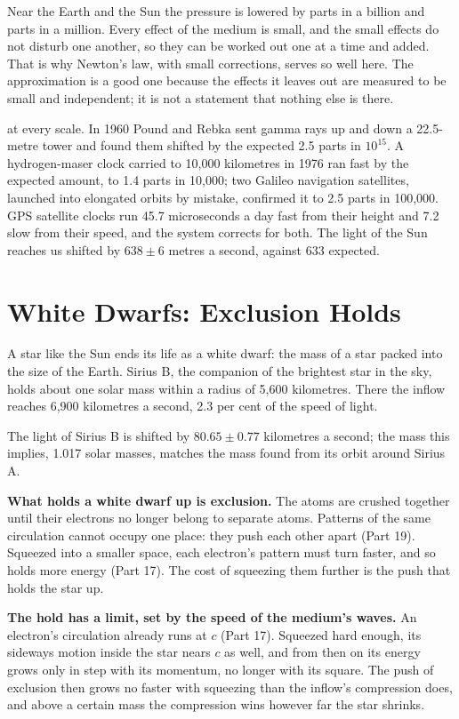 \documentclass[11pt,a4paper]{article}
\begin{document}
Near the Earth and the Sun the pressure is lowered by parts in a billion and parts in a million. Every effect of the medium is small, and the small effects do not disturb one another, so they can be worked out one at a time and added. That is why Newton's law, with small corrections, serves so well here. The approximation is a good one because the effects it leaves out are measured to be small and independent; it is not a statement that nothing else is there.

 at every scale. In 1960 Pound and Rebka sent gamma rays up and down a 22.5-metre tower and found them shifted by the expected 2.5 parts in $10^{15}$. A hydrogen-maser clock carried to 10,000 kilometres in 1976 ran fast by the expected amount, to 1.4 parts in 10,000; two Galileo navigation satellites, launched into elongated orbits by mistake, confirmed it to 2.5 parts in 100,000. GPS satellite clocks run 45.7 microseconds a day fast from their height and 7.2 slow from their speed, and the system corrects for both. The light of the Sun reaches us shifted by $638\pm6$ metres a second, against 633 expected.

\section{White Dwarfs: Exclusion Holds}

A star like the Sun ends its life as a white dwarf: the mass of a star packed into the size of the Earth. Sirius B, the companion of the brightest star in the sky, holds about one solar mass within a radius of 5,600 kilometres. There the inflow reaches 6,900 kilometres a second, 2.3 per cent of the speed of light.

 The light of Sirius B is shifted by $80.65\pm0.77$ kilometres a second; the mass this implies, 1.017 solar masses, matches the mass found from its orbit around Sirius A.

\begin{hypbar}
\textbf{What holds a white dwarf up is exclusion.} The atoms are crushed together until their electrons no longer belong to separate atoms. Patterns of the same circulation cannot occupy one place: they push each other apart (Part 19).\footnotemark{} Squeezed into a smaller space, each electron's pattern must turn faster, and so holds more energy (Part 17).\footnotemark{} The cost of squeezing them further is the push that holds the star up.

\textbf{The hold has a limit, set by the speed of the medium's waves.} An electron's circulation already runs at $c$ (Part 17). Squeezed hard enough, its sideways motion inside the star nears $c$ as well, and from then on its energy grows only in step with its momentum, no longer with its square. The push of exclusion then grows no faster with squeezing than the inflow's compression does, and above a certain mass the compression wins however far the star shrinks.
\end{hypbar}
\addtocounter{footnote}{-1}
\end{document}
